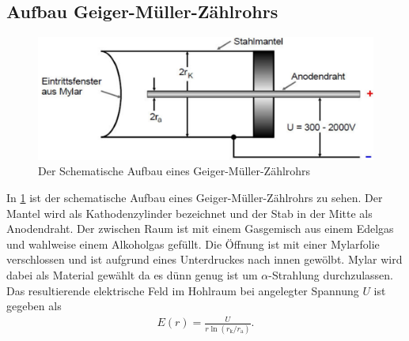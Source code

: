\subsection{Aufbau Geiger-Müller-Zählrohrs}
\begin{figure}[h!]
\centering
\includegraphics[scale=0.5]{Grafiken/schema.pdf}
\caption{Der Schematische Aufbau eines Geiger-Müller-Zählrohrs \cite{V703}}
\label{Th1}
\end{figure}
In \cref{Th1} ist der schematische Aufbau eines Geiger-Müller-Zählrohrs zu sehen. Der Mantel wird als Kathodenzylinder bezeichnet und der Stab in der Mitte als Anodendraht. Der zwischen Raum ist mit einem Gasgemisch aus einem Edelgas und wahlweise einem Alkoholgas gefüllt. Die Öffnung ist mit einer Mylarfolie verschlossen und ist aufgrund eines Unterdruckes nach innen gewölbt. Mylar wird dabei als Material gewählt da es dünn genug ist um $\alpha$-Strahlung durchzulassen. Das resultierende elektrische Feld im Hohlraum bei angelegter Spannung $U$ ist gegeben als
\begin{align}
E\left(r\right)=\frac{U}{r\ln\left( r_{\mathrm{k}}/r_{\mathrm{a}} \right)}.
\end{align}

